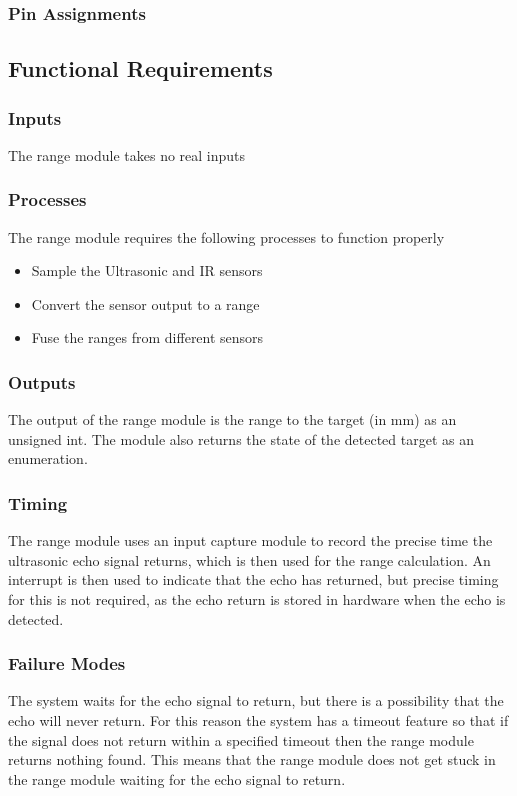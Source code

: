 \documentclass[]{report}
\begin{document}
\subsubsection{Pin Assignments}


\subsection{Functional Requirements}
\subsubsection{Inputs}
The range module takes no real inputs

\subsubsection{Processes}
The range module requires the following processes to function properly
\begin{itemize}
	\item Sample the Ultrasonic and IR sensors
	\item Convert the sensor output to a range
	\item Fuse the ranges from different sensors 
\end{itemize}

\subsubsection{Outputs}
The output of the range module is the range to the target (in mm) as an unsigned int. The module also returns the state of the detected target as an enumeration.

\subsubsection{Timing}
The range module uses an input capture module to record the precise time the ultrasonic echo signal returns, which is then used for the range calculation. An interrupt is then used to indicate that the echo has returned, but precise timing for this is not required, as the echo return is stored in hardware when the echo is detected. 

\subsubsection{Failure Modes}
The system waits for the echo signal to return, but there is a possibility that the echo will never return. For this reason the system has a timeout feature so that if the signal does not return within a specified timeout then the range module returns nothing found. This means that the range module does not get stuck in the range module waiting for the echo signal to return.
\end{document}
